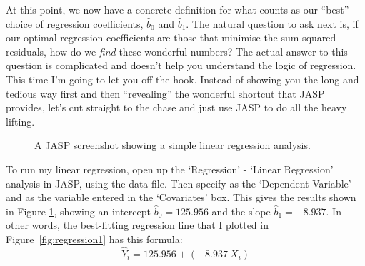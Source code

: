 At this point, we now have a concrete definition for what counts as our ``best'' choice of regression coefficients, $\hat{b}_0$ and $\hat{b}_1$. The natural question to ask next is,  if our optimal regression coefficients are those that minimise the sum squared residuals, how do we {\it find} these wonderful numbers? The actual answer to this question is complicated and doesn't help you understand the logic of regression.  This time I'm going to let you off the hook. Instead of showing you the long and tedious way first and then ``revealing'' the wonderful shortcut that JASP provides, let's cut straight to the chase and just use JASP to do all the heavy lifting. 


\begin{figure}[!htb]
\begin{center}
\caption{A JASP screenshot showing a simple linear regression analysis.}
\HR
\label{fig:reg1}
\end{center}
\end{figure}

To run my linear regression, open up the `Regression' - `Linear Regression' analysis in JASP, using the  data file. Then specify  as the `Dependent Variable' and  as the variable entered in the `Covariates' box. This gives the results shown in Figure \ref{fig:reg1}, showing an intercept $\hat{b}_0 = 125.956$ and the slope $\hat{b}_1 = -8.937$. In other words, the best-fitting regression line that I plotted in Figure~\ref{fig:regression1} has this formula:
$$
\hat{Y}_i = 125.956 + (-8.937 \ X_i)
$$ 

